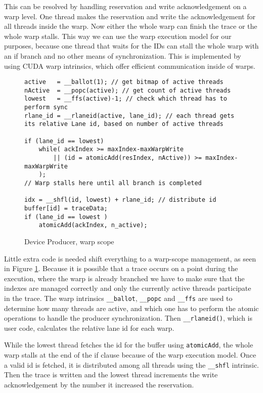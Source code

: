 	This can be resolved by handling reservation and write acknowledgement on a warp level. One thread makes the reservation and write the acknowledgement for all threads inside the warp. Now either the whole warp can finish the trace or the whole warp stalls. This way we can use the warp execution model for our purposes, because one thread that waits for the IDs can stall the whole warp with an if branch and no other means of synchronization. This is implemented by using CUDA warp intrinsics, which offer efficient communication inside of warps.
\begin{figure}[t]
	\begin{lstlisting}[style=C]
active   = __ballot(1); // get bitmap of active threads 
nActive  = __popc(active); // get count of active threads
lowest   = __ffs(active)-1; // check which thread has to perform sync
rlane_id = __rlaneid(active, lane_id); // each thread gets its relative Lane id, based on number of active threads
	
if (lane_id == lowest)
	while( ackIndex >= maxIndex-maxWarpWrite 
		|| (id = atomicAdd(resIndex, nActive)) >= maxIndex-maxWarpWrite
	);
// Warp stalls here until all branch is completed

idx = __shfl(id, lowest) + rlane_id; // distribute id
buffer[id] = traceData;
if (lane_id == lowest )
	atomicAdd(ackIndex, n_active);
	\end{lstlisting}
	\caption{Device Producer, warp scope}
	\label{prod-cons-warp}	
\end{figure}
	Little extra code is needed shift everything to a warp-scope management, as seen in Figure \ref{prod-cons-warp}. Because it is possible that a trace occurs on a point during the execution, where the warp is already branched we have to make sure
	that the indexes are managed correctly and only the currently active threads participate in the trace. The warp intrinsics \verb|__ballot|, \verb|__popc| and \verb|__ffs| are used to determine how many threads are active, and which one has to perform the atomic operations to handle
	the producer synchronization. Then \verb|__rlaneid()|, which is user code, calculates the relative lane id for each warp. 
	
	While the lowest thread fetches the id for the buffer using \verb|atomicAdd|, the whole warp stalls at the end of the if clause because of the warp execution model. Once a valid id is fetched, it is distributed among all threads using the \verb|__shfl| intrinsic. 	Then the trace is written and the lowest thread increments the write acknowledgement by the number it increased the reservation.
	
